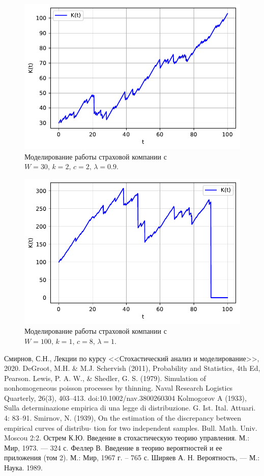 \documentclass[16pt]{article}
\begin{document}
\begin{figure}
	\center
	\includegraphics[scale=0.7]{11_7.pdf}
	\caption{Моделирование работы страховой компании с $W = 30,\, k = 2,\, c = 2,\, \lambda = 0.9$.}
\end{figure}

\begin{figure}
	\center
	\includegraphics[scale=0.7]{11_8.pdf}
	\caption{Моделирование работы страховой компании с $W = 100,\, k = 1,\, c = 8,\, \lambda = 1$.}
\end{figure}
\newpage
\center
\begin{thebibliography}{0}
Смирнов, С.Н., Лекции по курсу <<Стохастический анализ и моделирование>>, 2020.
DeGroot, M.H. \& M.J. Schervish (2011), Probability and Statistics, 4th Ed, Pearson.
Lewis, P. A. W., \& Shedler, G. S. (1979). Simulation of nonhomogeneous poisson processes by thinning. Naval Research Logistics Quarterly, 26(3), 403–413. doi:10.1002/nav.3800260304 
Kolmogorov A (1933), Sulla determinazione empirica di una legge di distribuzione. G. Ist. Ital. Attuari. 4: 83–91.
Smirnov, N. (1939), On the estimation of the discrepancy between empirical curves of distribu- tion for two independent samples. Bull. Math. Univ. Moscou 2:2. 
Острем К.Ю. Введение в стохастическую теорию управления. М.: Мир, 1973. --- 324 с.
Феллер В. Введение в теорию вероятностей и ее приложения (том 2). М.: Мир, 1967 г. – 765 с.
Ширяев А. Н. Вероятность, — М.: Наука. 1989. 
\end{thebibliography}
\end{document}

